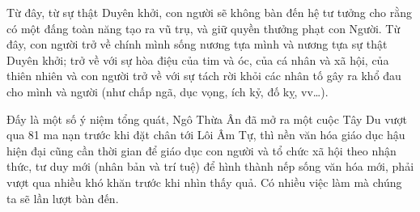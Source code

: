 Từ đây, từ sự thật Duyên khởi, con người sẽ không bàn đến hệ tư tưởng cho rằng có một đấng toàn năng tạo ra vũ trụ, và giữ quyền thưởng phạt con Người. Từ đây, con người trở về chính mình sống nương tựa mình và nương tựa sự thật Duyên khởi; trở về với sự hòa điệu của tim và óc, của cá nhân và xã hội, của thiên nhiên và con người trở về với sự tách rời khỏi các nhân tố gây ra khổ đau cho mình và người (như chấp ngã, dục vọng, ích kỷ, đố kỵ, vv\ldots).

Đấy là một số ý niệm tổng quát, Ngô Thừa Ân đã mở ra một cuộc Tây Du vượt qua 81 ma nạn trước khi đặt chân tới Lôi Âm Tự, thì nền văn hóa giáo dục hậu hiện đại cũng cần thời gian để giáo dục con người và tổ chức xã hội theo nhận thức, tư duy mới (nhân bản và trí tuệ) để hình thành nếp sống văn hóa mới, phải vượt qua nhiều khó khăn trước khi nhìn thấy quả. Có nhiều việc làm mà chúng ta sẽ lần lượt bàn đến.

